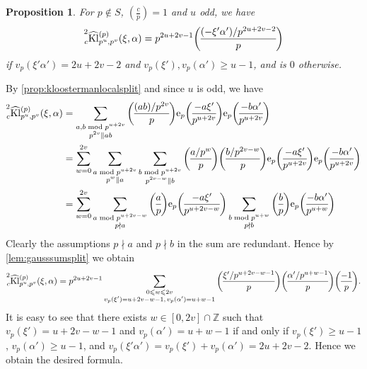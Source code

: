 \documentclass[10pt,oneside,reqno]{amsart}
\makeatletter
\newcommand\rme{\mathrm{e}}
\newcommand\ZZ{\mathbb{Z}}
\newcommand\Kl{\mathrm{Kl}}
\renewcommand\leq{\leqslant}
\renewcommand\geq{\geqslant}
\newcommand\legendresymbol[2]{\genfrac{(}{)}{}{}{#1}{#2}}
\theoremstyle{THEOREM}
\newtheorem{proposition}[theorem]{Proposition}
\theoremstyle{DEFINITION}
\theoremstyle{EXERCISE}
\numberwithin{equation}{section}
\renewenvironment{proof}[1][\proofname]{\par
  \vspace{-6pt}
  \pushQED{\qed}
  \normalfont \topsep6\p@\@plus6\p@\relax
  \trivlist
  \item[\hskip\labelsep\rmfamily\bfseries
    #1\@addpunct{:}]\ignorespaces
}{
  \popQED\endtrivlist\@endpefalse
  \vspace{-6pt}
}
\makeatother
\begin{document}
\begin{proposition}\label{prop:splitoddcase}
For $p\notin S$, $\legendresymbol{c}{p}=1$ and $u$ odd, we have
\[
\prescript{2}{c}{\widehat{\Kl}}_{p^u,p^v}^{(p)}(\xi,\alpha)=p^{2u+2v-1} \legendresymbol{(-\xi'\alpha')/p^{2u+2v-2}}{p}
\]
if $v_p(\xi'\alpha')=2u+2v-2$ and $v_p(\xi'),v_p(\alpha')\geq u-1$, and is $0$ otherwise.
\end{proposition} 
\begin{proof}
By \autoref{prop:kloostermanlocalsplit} and since $u$ is odd, we have
\begin{align*}
\prescript{2}{c}{\widehat{\Kl}}_{p^u,p^v}^{(p)}(\xi,\alpha)&=\sum_{\substack{a,b\bmod p^{u+2v}\\ p^{2v}\parallel ab}}\legendresymbol{(ab)/p^{2v}}{p}\rme_p\legendresymbol{-a\xi'}{p^{u+2v}} \rme_p\legendresymbol{-b\alpha'}{p^{u+2v}}\\
&=\sum_{w=0}^{2v}\sum_{\substack{a\bmod p^{u+2v}\\ p^{w}\parallel a}} \sum_{\substack{b\bmod p^{u+2v}\\ p^{2v-w}\parallel b}}\legendresymbol{a/p^{w}}{p}\legendresymbol{b/p^{2v-w}}{p}\rme_p\legendresymbol{-a\xi'}{p^{u+2v}} \rme_p\legendresymbol{-b\alpha'}{p^{u+2v}}\\
&=\sum_{w=0}^{2v}\sum_{\substack{a\bmod p^{u+2v-w}\\ p\nmid a}}\legendresymbol{a}{p}\rme_p\legendresymbol{-a\xi'}{p^{u+2v-w}}  \sum_{\substack{b\bmod p^{u+w}\\ p\nmid b}}\legendresymbol{b}{p} \rme_p\legendresymbol{-b\alpha'}{p^{u+w}}
\end{align*}
Clearly the assumptions $p\nmid a$ and $p\nmid b$ in the sum are redundant. Hence by \autoref{lem:gausssumsplit} we obtain
\[
\prescript{2}{c}{\widehat{\Kl}}_{p^u,p^v}^{(p)}(\xi,\alpha)=p^{2u+2v-1}\sum_{\substack{0\leq w\leq 2v\\ v_p(\xi')=u+2v-w-1,\,v_p(\alpha')=u+w-1}}\legendresymbol{\xi'/p^{u+2v-w-1}}{p} \legendresymbol{\alpha'/p^{u+w-1}}{p}\legendresymbol{-1}{p}.
\]
It is easy to see that there exists $w\in [0,2v]\cap \ZZ$ such that $v_p(\xi')=u+2v-w-1$ and $v_p(\alpha')=u+w-1$ if and only if $v_p(\xi')\geq u-1$, $v_p(\alpha')\geq u-1$, and $v_p(\xi'\alpha')=v_p(\xi')+v_p(\alpha')=2u+2v-2$. Hence we obtain the desired formula.
\end{proof}
\end{document}
